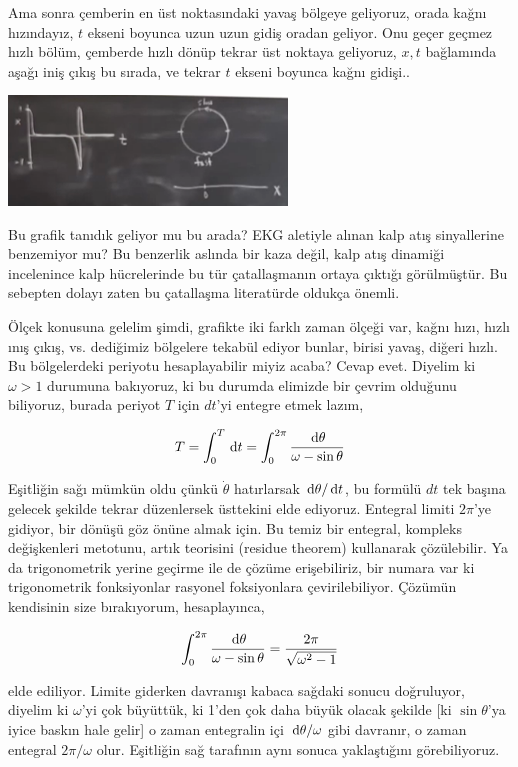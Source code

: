 \documentclass[12pt,fleqn]{article}\usepackage{../../common}
\begin{document}
Ama sonra çemberin en üst noktasındaki yavaş bölgeye geliyoruz, orada kağnı
hızındayız, $t$ ekseni boyunca uzun uzun gidiş oradan geliyor. Onu geçer
geçmez hızlı bölüm, çemberde hızlı dönüp tekrar üst noktaya geliyoruz,
$x,t$ bağlamında aşağı iniş çıkış bu sırada, ve tekrar $t$ ekseni boyunca
kağnı gidişi.. 

\includegraphics[width=20em]{14_19.png}

Bu grafik tanıdık geliyor mu bu arada? EKG aletiyle alınan kalp atış
sinyallerine benzemiyor mu? Bu benzerlik aslında bir kaza değil, kalp atış
dinamiği incelenince kalp hücrelerinde bu tür çatallaşmanın ortaya çıktığı
görülmüştür. Bu sebepten dolayı zaten bu çatallaşma literatürde oldukça
önemli. 

Ölçek konusuna gelelim şimdi, grafikte iki farklı zaman ölçeği var, kağnı
hızı, hızlı ınış çıkış, vs. dediğimiz bölgelere tekabül ediyor bunlar,
birisi yavaş, diğeri hızlı. Bu bölgelerdeki periyotu hesaplayabilir miyiz
acaba? Cevap evet. Diyelim ki $\omega > 1$ durumuna bakıyoruz, ki bu
durumda elimizde bir çevrim olduğunu biliyoruz, burada periyot $T$ için
$dt$'yi entegre etmek lazım,

$$ 
T = \int _{0}^{T} \,\mathrm{d} t = 
\int _{0}^{2\pi} \frac{\,\mathrm{d} \theta}{\omega - \sin\theta}
$$

Eşitliğin sağı mümkün oldu çünkü $\dot{\theta}$ hatırlarsak
$\,\mathrm{d} \theta / \,\mathrm{d} t$, bu formülü $dt$ tek başına gelecek şekilde tekrar
düzenlersek üsttekini elde ediyoruz. Entegral limiti $2\pi$'ye gidiyor, bir
dönüşü göz önüne almak için. Bu temiz bir entegral, kompleks değişkenleri
metotunu, artık teorisini (residue theorem) kullanarak çözülebilir. Ya da
trigonometrik yerine geçirme ile de çözüme erişebiliriz, bir numara var ki
trigonometrik fonksiyonlar rasyonel foksiyonlara çevirilebiliyor. Çözümün
kendisinin size bırakıyorum, hesaplayınca,

$$ 
\int _{0}^{2\pi} \frac{\,\mathrm{d} \theta}{\omega - \sin\theta} = 
\frac{2\pi}{\sqrt{\omega^2 - 1}}
$$

elde ediliyor. Limite giderken davranışı kabaca sağdaki sonucu doğruluyor,
diyelim ki $\omega$'yi çok büyüttük, ki 1'den çok daha büyük olacak şekilde
[ki $\sin\theta$'ya iyice baskın hale gelir] o zaman entegralin içi
$\,\mathrm{d} \theta / \omega$ gibi davranır, o zaman entegral $2\pi / \omega$
olur. Eşitliğin sağ tarafının aynı sonuca yaklaştığını görebiliyoruz.
\end{document}
